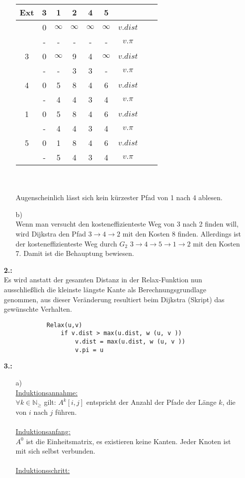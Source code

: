 \documentclass[a4paper,11pt,fleqn]{scrartcl}
\begin{document}
\begin{enumerate}
\begin{enumerate}
\begin{tabular}{c||c|c|c|c|c|c|c|c}
                Ext & 3 & 1 & 2 & 4 & 5 & \\ \hline \hline
				& 0 & $\infty$ & $\infty$ & $\infty$ & $\infty$ & $v.dist$ \\ \hline
                & - & - & - & - & - & $v.\pi$ \\ \hline
				3 & 0 & $\infty$ & 9 & 4 & $\infty$ & $v.dist$ \\ \hline
				& - & - & 3 & 3 & - & $v.\pi$ \\ \hline
				4 & 0 & 5 & 8 & 4 & 6 & $v.dist$ \\ \hline
				& - & 4 & 4 & 3 & 4 & $v.\pi$ \\ \hline
				1 & 0 & 5 & 8 & 4 & 6 & $v.dist$ \\ \hline
				& - & 4 & 4 & 3 & 4 & $v.\pi$ \\ \hline
				5 & 0 & 1 & 8 & 4 & 6 & $v.dist$ \\ \hline
				& - & 5 & 4 & 3 & 4 & $v.\pi$ \\
			\end{tabular} \\ \\
			Augenscheinlich lässt sich kein kürzester Pfad von 1 nach 4 ablesen.
			\item[b)] \quad \\
			Wenn man versucht den kosteneffizienteste Weg von 3 nach 2 finden will, wird Dijkstra den Pfad 
			\(3 \to 4 \to 2\) mit den Kosten 8 finden. Allerdings ist der kosteneffizienteste Weg durch
			\(G_2\) \(3 \to 4 \to 5 \to 1 \to 2\) mit den Kosten 7. Damit ist die Behauptung bewiesen.
		\end{enumerate}
		\item[\textbf{2.:}] \quad \\
		Es wird anstatt der gesamten Distanz in der Relax-Funktion nun ausschließlich die kleinste längste
		Kante als Berechnungsgrundlage genommen, aus dieser Veränderung resultiert beim Dijkstra (Skript) 
		das gewünschte Verhalten.
		\begin{verbatim}
			Relax(u,v)
			    if v.dist > max(u.dist, w (u, v ))
			        v.dist = max(u.dist, w (u, v ))
			        v.pi = u
		\end{verbatim}
		\item[\textbf{3.:}]
		\begin{enumerate}
			\item[a)] \quad \\
			\underline{Induktionsannahme:} \\
			\(\forall k \in \mathbb{N}_{\geq}\) gilt: \( A^k[i,j]\) entspricht der Anzahl der Pfade der Länge
			\(k\), die von \(i\) nach \(j\) führen. \\ \\
			\underline{Induktionsanfang:} \\
			\(A^0\) ist die Einheitsmatrix, es existieren keine Kanten. Jeder Knoten ist mit sich selbst 
			verbunden. \\ \\
			\underline{Induktionsschritt:} \\
			

\end{enumerate}
\end{enumerate}
\end{document}
